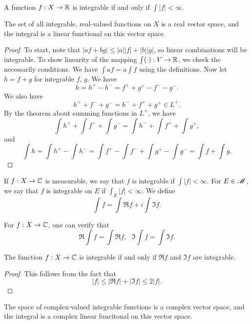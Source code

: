 \documentclass[12pt]{article} %
\begin{document}
\begin{proposition}
    A function $f : X \to \mathbb{R}$ is integrable if and only if $\int |f| < \infty$.
\end{proposition}

\begin{proposition}
    The set of all integrable, real-valued functions on $X$ is a real vector space, and the integral is a linear functional on this vector space.
\end{proposition}

\begin{proof}
    To start, note that $|af + bg| \leq |a||f| + |b||g|$, so linear combinations will be integrable. To show linearity of the mapping $\int (\cdot) : V \to \mathbb{R}$, we check the necessarily conditions. We have $\int a f = a \int f$ using the definitions. Now let $h = f + g$ for integrable $f$, $g$. We have \[h = h^+ - h^- = f^+ + g^+ - f^- - g^-.\] We also have \[h^+ + f^- + g^- = h^- + f^+ + g^+ \in L^+.\] By the theorem about summing functions in $L^+$, we have \[\int h^+ + \int f^- + \int g^- = \int h^- + \int f^+ + \int g^+,\] and \[\int h = \int h^+ - \int h^- = \int f^+ - \int f^-  +\int g^+ - \int g^- = \int f + \int g.\]
\end{proof}

\begin{definition}
    If $f : X \to \mathbb{C}$ is measurable, we say that $f$ is integrable if $\int |f| < \infty$. For $E \in \mathscr{M}$, we say that $f$ is integrable on $E$ if $\int_E |f| < \infty$. We define \[\int f = \int \Re f + i \int \Im f.\]
\end{definition}

\begin{remark}
    For $f : X \to \mathbb{C}$, one can verify that \[\Re \int f = \int \Re f, \ \ \ \Im \int f = \int \Im f.\]
\end{remark}

\begin{proposition}
    The function $f: X \to \mathbb{C}$ is integrable if and only if $\Re f$ and $\Im f$ are integrable. 
\end{proposition}

\begin{proof}
    This follows from the fact that \[|f| \leq |\Re f| + |\Im f| \leq 2|f|.\]
\end{proof}

\begin{proposition}
    The space of complex-valued integrable functions is a complex vector space, and the integral is a complex linear funcitonal on this vector space.
\end{proposition}
\end{document}
